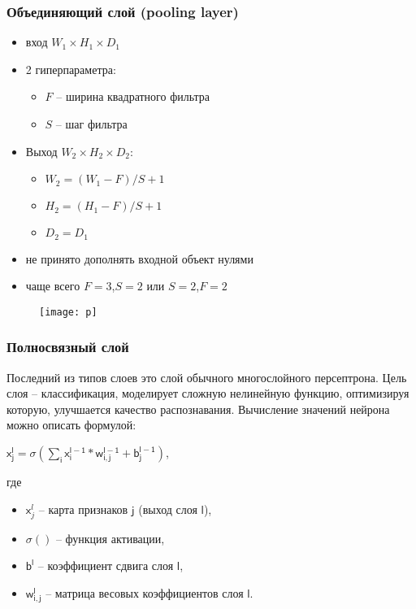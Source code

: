 \documentclass[unicode, notheorems]{beamer}
\begin{document}
\begin{frame}
	\frametitle{Объединяющий слой (pooling layer)}
		\begin{itemize}
			\item вход $W_{1} \times H_{1} \times D_{1}$
			\item 2 гиперпараметра: 
				\begin{itemize}
					\item $F$ -- ширина квадратного фильтра
					\item $S$ -- шаг фильтра
				\end{itemize}
			\item Выход $W_{2} \times H_{2} \times D_{2}$:
				\begin{itemize}
					\item $W_{2} = (W_{1} - F)/S + 1$
					\item $H_{2} = (H_{1} - F)/S + 1$
					\item $D_{2} = D_{1}$
				\end{itemize}
			\item не принято дополнять входной объект нулями
			\item чаще всего $F=3$,$S=2$ или $S=2$,$F=2$
		\end{itemize}
		\begin{figure}[h]
	\begin{center}
		\begin{minipage}[h]{0.92\linewidth}
			\texttt{[image: p]}
		\end{minipage}
	\end{center}
\end{figure}
\end{frame}

\begin{frame}
	\frametitle{Полносвязный слой}
	Последний из типов слоев это слой обычного многослойного персептрона. Цель слоя – классификация, моделирует сложную нелинейную функцию, оптимизируя которую, улучшается качество распознавания. Вычисление значений нейрона можно описать формулой:
	\begin{center}
		$\mathsf{x}_{\mathsf{j}}^{\mathsf{l}} = \sigma(\sum \limits_{\mathsf{i}} \mathsf{x}_{\mathsf{i}}^{\mathsf{l-1}} * \mathsf{w}_{\mathsf{i,j}}^{\mathsf{l-1}}+\mathsf{b}_{\mathsf{j}}^{\mathsf{l-1}})$,
	\end{center}
	где
	\begin{itemize}
		\item $\mathsf{x}_{j}^{l}$ -- карта признаков $\mathsf{j}$ (выход слоя $\mathsf{l}$), 
		\item $\sigma()$ -- функция активации,
		\item $\mathsf{b}^{\mathsf{l}}$ -- коэффициент сдвига слоя $\mathsf{l}$,
		\item $\mathsf{w}_{\mathsf{i,j}}^{\mathsf{l}}$ -- матрица весовых коэффициентов слоя $\mathsf{l}$.
	\end{itemize}
\end{frame}
\end{document}
